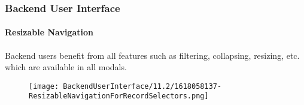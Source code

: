 %

\begin{frame}[fragile]
	\frametitle{Backend User Interface}
	\framesubtitle{Resizable Navigation}

	Backend users benefit from all features such as filtering, collapsing, resizing,
	etc. which are available in all modals.

	\begin{figure}
		\texttt{[image: BackendUserInterface/11.2/1618058137-ResizableNavigationForRecordSelectors.png]}
	\end{figure}

\end{frame}

